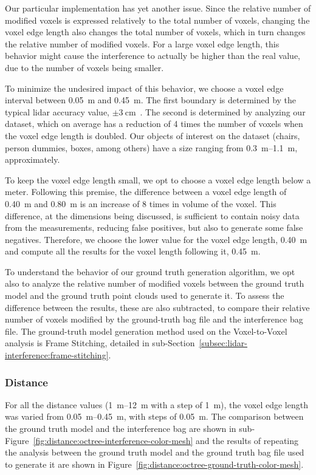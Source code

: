 Our particular implementation has yet another issue. Since the relative number of modified voxels is expressed relatively to the total number of voxels, changing the voxel edge length also changes the total number of voxels, which in turn changes the relative number of modified voxels. For a large voxel edge length, this behavior might cause the interference to actually be higher than the real value, due to the number of voxels being smaller. 

To minimize the undesired impact of this behavior, we choose a voxel edge interval between \SI{0.05}{\meter} and \SI{0.45}{\meter}. The first boundary is determined by the typical \ac{lidar} accuracy value, $\pm\SI{3}{\centi\meter}$~\cite{VLP16}. The second is determined by analyzing our dataset, which on average has a reduction of 4 times the number of voxels when the voxel edge length is doubled. Our objects of interest on the dataset (chairs, person dummies, boxes, among others) have a size ranging from \SIrange{0.3}{1.1}{\meter}, approximately. 

To keep the voxel edge length small, we opt to choose a voxel edge length below a meter. Following this premise, the difference between a voxel edge length of \SI{0.40}{\meter} and \SI{0.80}{\meter} is an increase of 8 times in volume of the voxel. This difference, at the dimensions being discussed, is sufficient to contain noisy data from the measurements, reducing false positives, but also to generate some false negatives. Therefore, we choose the lower value for the voxel edge length, \SI{0.40}{\meter} and compute all the results for the voxel length following it, \SI{0.45}{\meter}.

To understand the behavior of our ground truth generation algorithm, we opt also to analyze the relative number of modified voxels between the ground truth model and the ground truth point clouds used to generate it. To assess the difference between the results, these are also subtracted, to compare their relative number of voxels modified by the ground-truth bag file and the interference bag file. The ground-truth model generation method used on the Voxel-to-Voxel analysis is Frame Stitching, detailed in sub-Section~\ref{subsec:lidar-interference:frame-stitching}.

\subsubsection{Distance}
For all the distance values (\SIrange{1}{12}{\meter} with a step of \SI{1}{\meter}), the voxel edge length was varied from \SIrange{0.05}{0.45}{\meter}, with steps of \SI{0.05}{\meter}. The comparison between the ground truth model and the interference bag are shown in sub-Figure~\ref{fig:distance:octree-interference-color-mesh} and the results of repeating the analysis between the ground truth model and the ground truth bag file used to generate it are shown in Figure~\ref{fig:distance:octree-ground-truth-color-mesh}. 

